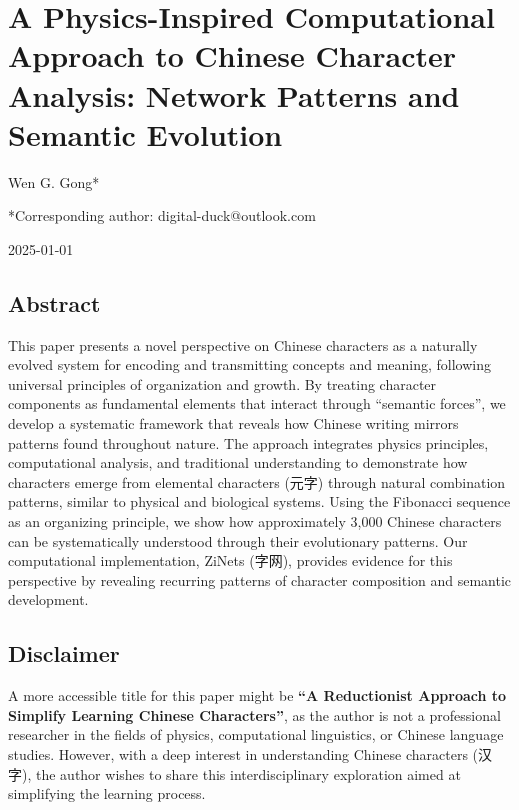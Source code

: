 \documentclass[
  11pt,
  letterpaper,
]{article}
\author{}
\date{}
\begin{document}
\hypertarget{a-physics-inspired-computational-approach-to-chinese-character-analysis-network-patterns-and-semantic-evolution}{%
\section{A Physics-Inspired Computational Approach to Chinese Character
Analysis: Network Patterns and Semantic
Evolution}\label{a-physics-inspired-computational-approach-to-chinese-character-analysis-network-patterns-and-semantic-evolution}}

Wen G. Gong*

*Corresponding author: digital-duck@outlook.com

2025-01-01

\hypertarget{abstract}{%
\subsection{Abstract}\label{abstract}}

This paper presents a novel perspective on Chinese characters as a
naturally evolved system for encoding and transmitting concepts and
meaning, following universal principles of organization and growth. By
treating character components as fundamental elements that interact
through ``semantic forces'', we develop a systematic framework that
reveals how Chinese writing mirrors patterns found throughout nature.
The approach integrates physics principles, computational analysis, and
traditional understanding to demonstrate how characters emerge from
elemental characters (元字) through natural combination patterns,
similar to physical and biological systems. Using the Fibonacci sequence
as an organizing principle, we show how approximately 3,000 Chinese
characters can be systematically understood through their evolutionary
patterns. Our computational implementation, ZiNets (字网), provides
evidence for this perspective by revealing recurring patterns of
character composition and semantic development.

\hypertarget{disclaimer}{%
\subsection{Disclaimer}\label{disclaimer}}

A more accessible title for this paper might be \textbf{``A Reductionist
Approach to Simplify Learning Chinese Characters''}, as the author is
not a professional researcher in the fields of physics, computational
linguistics, or Chinese language studies. However, with a deep interest
in understanding Chinese characters (汉字), the author wishes to share
this interdisciplinary exploration aimed at simplifying the learning
process.
\end{document}
